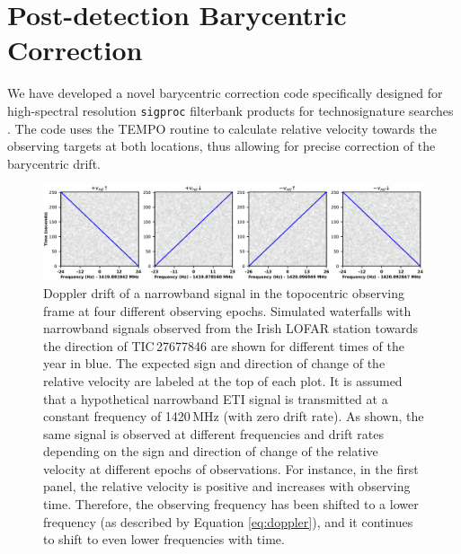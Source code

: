 

\chapter{Post-detection Barycentric Correction} \label{appen:barycenter}
We have developed a novel barycentric correction code specifically designed for high-spectral resolution \texttt{sigproc} filterbank products for technosignature searches \citep{Vishal_Bary}. The code uses the TEMPO routine to calculate relative velocity towards the observing targets at both locations, thus allowing for precise correction of the barycentric drift.

\begin{figure}[h]
    \centering
    \includegraphics[scale=0.45]{SETI/figures/Barycentric_frequency_drift.pdf}
    \caption{Doppler drift of a narrowband signal in the topocentric observing frame at four different observing epochs. Simulated waterfalls with narrowband signals observed from the Irish LOFAR station towards the direction of TIC\,27677846 are shown for different times of the year in blue. The expected sign and direction of change of the relative velocity are labeled at the top of each plot. It is assumed that a hypothetical narrowband ETI signal is transmitted at a constant frequency of 1420\,MHz (with zero drift rate). As shown, the same signal is observed at different frequencies and drift rates depending on the sign and direction of change of the relative velocity at different epochs of observations. For instance, in the first panel, the relative velocity is positive and increases with observing time. Therefore, the observing frequency has been shifted to a lower frequency (as described by Equation \ref{eq:doppler}), and it continues to shift to even lower frequencies with time.}
    \label{fig:bary_simulated_drift}
\end{figure}
 
